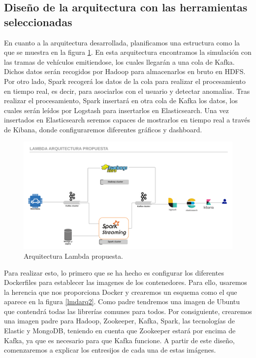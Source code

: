 \subsection{Diseño de la arquitectura con las herramientas seleccionadas\label{disenio}}

En cuanto a la arquitectura desarrollada, planificamos una estructura como
la que se muestra en la figura \ref{lmdarq1}. En esta arquitectura
encontramos la simulación con las tramas de vehículos emitiendose, los
cuales llegarán a una cola de Kafka. Dichos datos serán recogidos por
Hadoop para almacenarlos en bruto en HDFS. Por otro lado, Spark recogerá
los datos de la cola para realizar el procesamiento en tiempo real, es
decir, para asociarlos con el usuario y detectar anomalías. Tras realizar
el procesamiento, Spark insertará en otra cola de Kafka los datos, los
cuales serán leídos por Logstash para insertarlos en Elasticsearch. Una vez
insertados en Elasticsearch seremos capaces de mostrarlos en tiempo real a
través de Kibana, donde configuraremos diferentes gráficos y dashboard.

\begin{figure}[htp]
\centering
\includegraphics[scale=0.26]{Imagenes/arqProp1.png}
\caption{Arquitectura Lambda propuesta.}
\label{lmdarq1}
\end{figure}

Para realizar esto, lo primero que se ha hecho es configurar los diferentes
Dockerfiles para establecer las imagenes de los contenedores. Para ello,
usaremos la herencia que nos proporciona Docker y crearemos un esquema como
el que aparece en la figura \ref{lmdarq2}. Como padre tendremos una imagen
de Ubuntu que contendrá todas las librerías comunes para todos. Por
consiguiente, crearemos una imagen padre para Hadoop, Zookeeper, Kafka,
Spark, las tecnologías de Elastic y MongoDB, teniendo en cuenta que
Zookeeper estará por encima de Kafka, ya que es necesario para que Kafka
funcione. A partir de este diseño, comenzaremos a explicar los entresijos
de cada una de estas imágenes.

